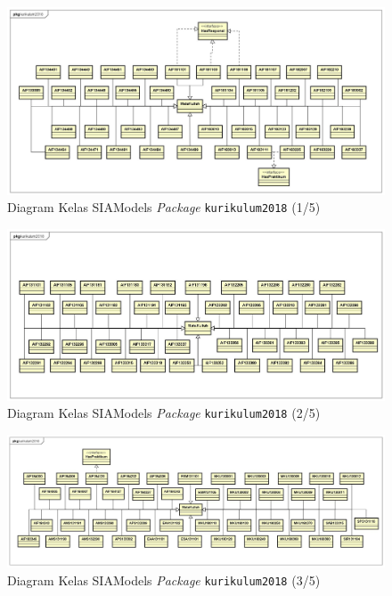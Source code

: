 \begin{figure}[H]
\centering
\includegraphics[scale=0.28]{Gambar/class-diagram-siamodels-mk-kurikulum-2018-2}
\caption{Diagram Kelas SIAModels \textit{Package} \texttt{kurikulum2018} (1/5)}
\label{fig:siamodels_class_2018_kurikulum_1}
\end{figure}

\begin{figure}[H]
\centering
\includegraphics[scale=0.29]{Gambar/class-diagram-siamodels-mk-kurikulum-2018-1}
\caption{Diagram Kelas SIAModels \textit{Package} \texttt{kurikulum2018} (2/5)}
\label{fig:siamodels_class_2018_kurikulum_2}
\end{figure}

\begin{figure}[H]
\centering
\includegraphics[scale=0.25]{Gambar/class-diagram-siamodels-mk-kurikulum-2018-3}
\caption{Diagram Kelas SIAModels \textit{Package} \texttt{kurikulum2018} (3/5)}
\label{fig:siamodels_class_2018_kurikulum_3}
\end{figure}

